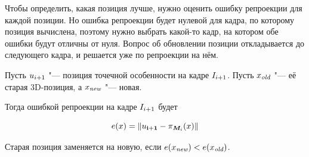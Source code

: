 
Чтобы определить, какая позиция лучше, нужно оценить ошибку репроекции для
каждой позиции.
Но ошибка репроекции будет нулевой для кадра, по которому позиция вычислена,
поэтому нужно выбрать какой-то кадр, на котором обе ошибки будут отличны от
нуля.
Вопрос об обновлении позиции откладывается до следующего кадра, и решается уже
по репроекции на нём.

Пусть $\mathnormal{u}_{i + 1}$ "--- позиция точечной особенности на кадре $I_{i +
1}$.
Пусть $\mathnormal{x_{\text {\it old}}}$ "--- её старая 3D-позиция, а $\mathnormal{x_{\text{\it new}}}$ "--- новая. 

Тогда ошибкой репроекции на кадре $I_{i + 1}$ будет

\begin{equation}
\label{eqn:err_reproj}
\mathnormal{e}( \mathnormal{x} ) = \| \mathbf{\mathnormal{u}_{i + 1}} - \pi_{\bm{M}_i}(\mathnormal{x}) \|
\end{equation}

Старая позиция заменяется на новую, если $\mathnormal{e}( \mathnormal{x_{\text{\it new}}} ) < \mathnormal{e}( \mathnormal{x_{\text {\it old}}} )$.
